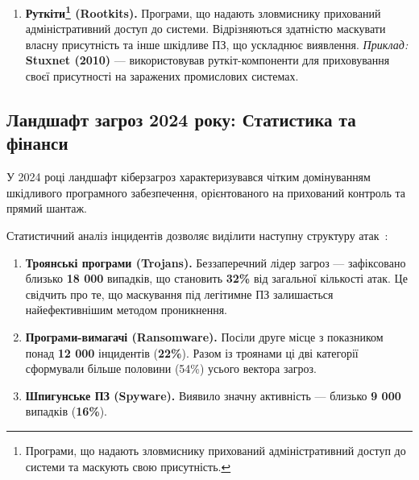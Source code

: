 \begin{enumerate}
    Згідно з аналітичними даними компаній Check Point та Symantec, у 2023–2024 роках частка мобільного шпигунського ПЗ у загальній структурі шкідливих програм зросла з 12\% до 15\%. Експерти пов'язують цей тренд з еволюцією банківських троянів, які дедалі частіше інтегрують у себе шпигунські модулі для тотального контролю над інфікованим смартфоном~\cite{CheckPoint_2024, Symantec_Threat_2024}.

    \item \textbf{Руткіти\footnote{Програми, що надають зловмиснику прихований адміністративний доступ до системи та маскують свою присутність.} (Rootkits).}
    Програми, що надають зловмиснику прихований адміністративний доступ до системи. Відрізняються здатністю маскувати власну присутність та інше шкідливе ПЗ, що ускладнює виявлення.
    \newline \textit{Приклад:} \textbf{Stuxnet (2010)} — використовував руткіт-компоненти для приховування своєї присутності на заражених промислових системах.
\end{enumerate}

\subsection*{Ландшафт загроз 2024 року: Статистика та фінанси}

У 2024 році ландшафт кіберзагроз характеризувався чітким домінуванням шкідливого програмного забезпечення, орієнтованого на прихований контроль та прямий шантаж.

Статистичний аналіз інцидентів дозволяє виділити наступну структуру атак~\cite{AnyRun_Malware_2024}:

\begin{enumerate}
    \item \textbf{Троянські програми (Trojans).}
    Беззаперечний лідер загроз — зафіксовано близько \textbf{18 000} випадків, що становить \textbf{32\%} від загальної кількості атак. Це свідчить про те, що маскування під легітимне ПЗ залишається найефективнішим методом проникнення.

    \item \textbf{Програми-вимагачі (Ransomware).}
    Посіли друге місце з показником понад \textbf{12 000} інцидентів (\textbf{22\%}). Разом із троянами ці дві категорії сформували більше половини (54\%) усього вектора загроз.

    \item \textbf{Шпигунське ПЗ (Spyware).}
    Виявило значну активність — близько \textbf{9 000} випадків (\textbf{16\%}).
\end{enumerate}

